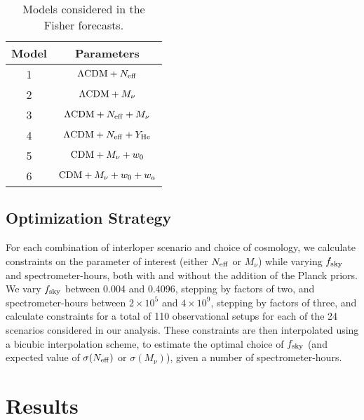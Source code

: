 \documentclass[twocolumn]{aastex631}
\renewcommand{\arraystretch}{1.6}
\begin{document}
\begin{table}[t]
\caption{Models considered in the Fisher forecasts.}\label{tab:models} \vspace{.1in}
\renewcommand{\arraystretch}{1.2}
\hspace{.3in}\begin{tabular}{c  c }
    \hline
    Model &  Parameters \vspace{.04in}\\
    \hline
    1 & $\Lambda{\rm CDM}+N_{\rm eff}$ \\
    2 & $\Lambda{\rm CDM}+M_\nu$  \\
    3 & $\Lambda{\rm CDM}+N_{\rm eff}+M_\nu$ \\
    4 &  $\Lambda{\rm CDM}+N_{\rm eff}+Y_{\rm He}$ \\
    5 & ${\rm CDM}+M_\nu + w_0$  \\
    6 &  ${\rm CDM}+M_\nu + w_0 + w_a$  \vspace{.04in} \\
    \hline
\end{tabular}
\end{table}

\subsection{Optimization Strategy}

For each combination of interloper scenario and choice of cosmology, we calculate constraints on the parameter of interest (either $N_{\rm eff}$ or $M_{\nu}$) while varying $f_{\rm sky}$ and spectrometer-hours, both with and without the addition of the Planck priors. We vary $f_{\rm sky}$ between 0.004 and 0.4096, stepping by factors of two, and spectrometer-hours between $2\times10^5$ and $4\times10^{9}$, stepping by factors of three, and calculate constraints for a total of 110 observational setups for each of the 24 scenarios considered in our analysis. These constraints are then interpolated using a bicubic interpolation scheme, to estimate the optimal choice of $f_{\rm sky}$ (and expected value of $\sigma(N_{\rm eff})$ or $\sigma(M_\nu)$), given a number of spectrometer-hours. \vspace{-.08in} \\

\section{Results}\label{sec:results}
\end{document}
